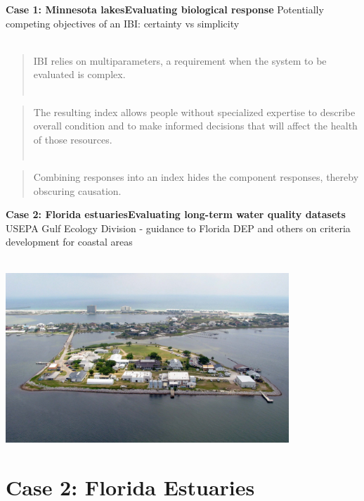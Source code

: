 \documentclass[serif]{beamer}\usepackage[]{graphicx}\usepackage[]{color}
\begin{document}
\begin{frame}{\textbf{Case 1: Minnesota lakes}}{\textbf{Evaluating biological response}}
Potentially competing objectives of an IBI: certainty vs simplicity \\~\\
\pause
\begin{quote}
IBI relies on multiparameters, a requirement when the system to be evaluated is complex. \cite{Karr86} \\~\\
\end{quote}
\begin{quote}
The resulting index allows people without specialized expertise to describe overall condition and to make informed decisions that will affect the health of those resources. \cite{Karr99} \\~\\
\end{quote}
\pause
\begin{quote}
Combining responses into an index hides the component responses, thereby obscuring causation. \cite{Suter93}
\end{quote}
\end{frame}

\begin{frame}{\textbf{Case 2: Florida estuaries}}{\textbf{Evaluating long-term water quality datasets}}
USEPA Gulf Ecology Division - guidance to Florida DEP and others on criteria development for coastal areas\\~\\
\centerline{\includegraphics[width = 0.8\textwidth]{fig/sabine.pdf}}
\end{frame}

\section{Case 2: Florida Estuaries}
\end{document}
